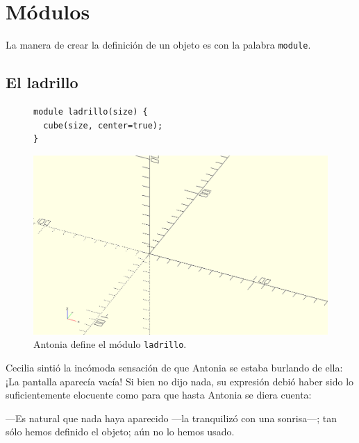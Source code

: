 \section{Módulos}


\guillemotright La manera de crear la definición de un objeto es con
la palabra \lstinline!module!.

\subsection{El ladrillo}

\begin{figure}[ht]
  \begin{minipage}[]{.6\textwidth}
    \begin{lstlisting}
module ladrillo(size) {
  cube(size, center=true);
}
    \end{lstlisting}
  \end{minipage}\hfill
    \begin{minipage}[]{.4\textwidth}
      \centering
      \includegraphics[width=.9\textwidth]{imagenes/vacio}
    \end{minipage}
    \caption{Antonia define el módulo \texttt{ladrillo}.}
    \label{fig:modulo-ladrillo}
  \end{figure}
  
  Cecilia sintió la incómoda sensación de que Antonia se estaba
  burlando de ella: ¡La pantalla aparecía vacía! Si bien no dijo nada,
  su expresión debió haber sido lo suficientemente elocuente como para
  que hasta Antonia se diera cuenta:

  ---Es natural que nada haya aparecido ---la tranquilizó con una
  sonrisa---; tan sólo hemos definido el objeto; aún no lo hemos
  usado.

